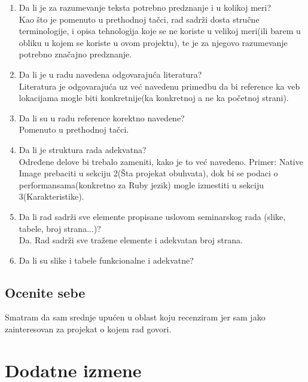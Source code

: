 \documentclass[a4paper]{report}
\begin{document}
\begin{enumerate}
\item Da li je za razumevanje teksta potrebno predznanje i u kolikoj meri?\\
Kao što je pomenuto u prethodnoj tačci, rad sadrži dosta stručne terminologije, i opisa tehnologija koje se ne koriste u velikoj meri(ili barem 
u obliku u kojem se koriste u ovom projektu), te je za njegovo razumevanje potrebno značajno predznanje.

\item Da li je u radu navedena odgovarajuća literatura?\\
Literatura je odgovarajuća uz već navedenu primedbu da bi reference ka veb lokacijama mogle biti konkretnije(ka konkretnoj a ne ka početnoj 
strani).

\item Da li su u radu reference korektno navedene?\\
Pomenuto u prethodnoj tačci.

\item Da li je struktura rada adekvatna?\\
Određene delove bi trebalo zameniti, kako je to već navedeno. Primer: Native Image prebaciti u sekciju 2(Šta projekat obuhvata), dok bi se 
podaci o performansama(konkretno za Ruby jezik) mogle izmestiti u sekciju 3(Karakteristike).

\item Da li rad sadrži sve elemente propisane uslovom seminarskog rada (slike, tabele, broj strana...)?\\
Da. Rad sadrži sve tražene elemente i adekvatan broj strana. 

\item Da li su slike i tabele funkcionalne i adekvatne?\\


\end{enumerate}

\section{Ocenite sebe}
Smatram da sam srednje upućen u oblast koju recenziram jer sam jako zainteresovan za projekat o kojem rad govori.



\chapter{Dodatne izmene}
\end{document}
